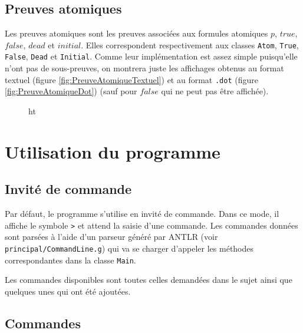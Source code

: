 \documentclass[dvipsnames]{report}
\begin{document}


\subsection{Preuves atomiques}

Les preuves atomiques sont les preuves associées aux formules atomiques $p$, $true$, $false$, $dead$ et $initial$. Elles correspondent respectivement aux classes \texttt{Atom}, \texttt{True}, \texttt{False}, \texttt{Dead} et \texttt{Initial}. Comme leur implémentation est assez simple puisqu'elle n'ont pas de sous-preuves, on montrera juste les affichages obtenus au format textuel (figure \ref{fig:PreuveAtomiqueTextuel}) et au format \texttt{.dot} (figure \ref{fig:PreuveAtomiqueDot}) (sauf pour $false$ qui ne peut pas être affichée).



\begin{figure}{ht}

\end{figure}

\section{Utilisation du programme}

\subsection{Invité de commande}

Par défaut, le programme s'utilise en invité de commande. Dans ce mode, il affiche le symbole \texttt{>} et attend la saisie d'une commande. Les commandes données sont parsées à l'aide d'un parseur généré par ANTLR (voir \texttt{principal/CommandLine.g}) qui va se charger d'appeler les méthodes correspondantes dans la classe \texttt{Main}.

Les commandes disponibles sont toutes celles demandées dans le sujet ainsi que quelques unes qui ont été ajoutées.

\subsection{Commandes}
\end{document}

